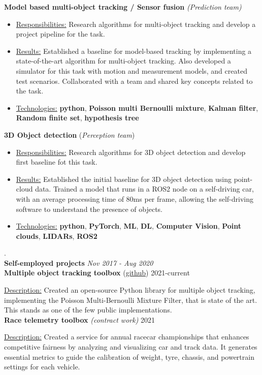 \documentclass[12pt, a4paper]{extarticle}
\newcommand{\mymk}[1]{\textbf{#1}}
\begin{document}
\textbf{Model based multi-object tracking / Sensor fusion} \textit{(Prediction team)}
\begin{itemize}
	\item[] \underline{Responsibilities:} Research algorithms for multi-object tracking and develop a project pipeline for the task.
	\item[] \underline{Results:} Established a baseline for model-based tracking by implementing a state-of-the-art algorithm for multi-object tracking. Also developed a simulator for this task with motion and measurement models, and created test scenarios. Collaborated with a team and shared key concepts related to the task.
	\item[] \underline{Technologies:} \mymk{python}, \mymk{Poisson multi Bernoulli mixture}, \mymk{Kalman
			filter}, \mymk{Random finite set}, \mymk{hypothesis tree}
\end{itemize}

\textbf{3D Object detection} (\textit{Perception team})
\begin{itemize}
	\item[] \underline{Responsibilities:} Research algorithms for 3D object detection and develop first baseline fot this task.
	\item[] \underline{Results:} Established the initial baseline for 3D object detection using point-cloud data. Trained a model that runs in a ROS2 node on a self-driving car, with an average processing time of 80ms per frame, allowing the self-driving software to understand the presence of objects.
	\item[] \underline{Technologies:} \mymk{python}, \mymk{PyTorch}, \mymk{ML}, \mymk{DL}, \mymk{Computer Vision}, \mymk{Point clouds}, \mymk{LIDARs},  \mymk{ROS2}
\end{itemize}
\par .\\
%
\textbf{Self-employed projects}  \hfill \textit{Nov 2017 - Aug 2020}
\\
\textbf{Multiple object tracking toolbox} (\href{https://github.com/neer201/Multi-Object-Tracking-for-Automotive-Systems-in-python}{github}) \hfill 2021-current

\underline{Description:} Created an open-source Python library for multiple object tracking, implementing the Poisson Multi-Bernoulli Mixture Filter, that is state of the art. This stands as one of the few public implementations.\\
\textbf{Race telemetry toolbox} \textit{(contract work)} \hfill 2021
\par
\underline{Description:} Created a service for annual racecar championships that enhances competitive fairness by analyzing and visualizing car and track data. It generates essential metrics to guide the calibration of weight, tyre, chassis, and powertrain settings for each vehicle.
\end{document}
